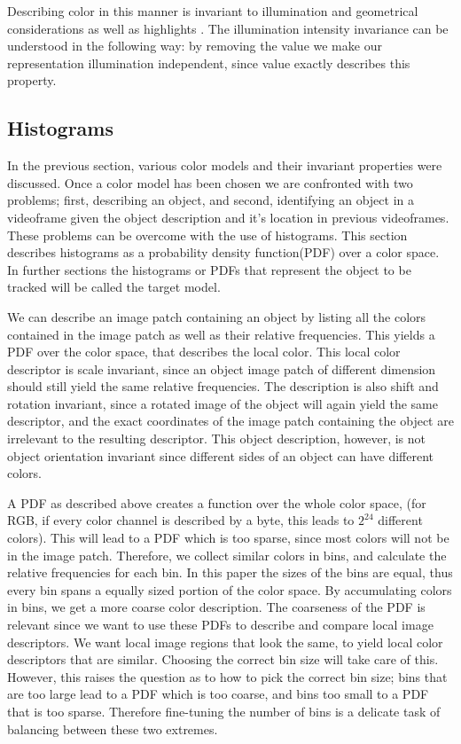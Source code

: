 \documentclass[a4paper,11pt]{article}
\begin{document}
Describing color in this manner is invariant to illumination and geometrical considerations as well as highlights \cite{gevers_invariant}. The illumination intensity invariance can be understood in the following way: by removing the value we make our representation illumination independent, since value exactly describes this property.

\subsection{Histograms}

In the previous section, various color models and their invariant properties were discussed. Once a color model has been chosen we are confronted with two problems; first, describing an object, and second, identifying an object in a videoframe given the object description and it's location in previous videoframes. These problems can be overcome with the use of histograms. This section describes histograms as a probability density function(PDF) over a color space. In further sections the histograms or PDFs that represent the object to be tracked will be called the target model.

We can describe an image patch containing an object by listing all the colors contained in the image patch as well as their relative frequencies. This yields a PDF over the color space, that describes the local color. This local color descriptor is scale invariant, since an object image patch of different dimension should still yield the same relative frequencies. The description is also shift and rotation invariant, since a rotated image of the object will again yield the same descriptor, and the exact coordinates of the image patch containing the object are irrelevant to the resulting descriptor. This object description, however, is not object orientation invariant since different sides of an object can have different colors. 

A PDF as described above creates a function over the whole color space, (for RGB, if every color channel is described by a byte, this leads to $2^{24}$ different colors). This will lead to a PDF which is too sparse, since most colors will not be in the image patch. Therefore, we collect similar colors in bins, and calculate the relative frequencies for each bin. In this paper the sizes of the bins are equal, thus every bin spans a equally sized portion of the color space. By accumulating colors in bins, we get a more coarse color description. The coarseness of the PDF is relevant since we want to use these PDFs to describe and compare local image descriptors. We want local image regions that look the same, to yield local color descriptors that are similar.  Choosing the correct bin size will take care of this. However, this raises the question as to how to pick the correct bin size; bins that are too large lead to a PDF which is too coarse, and bins too small to a PDF that is too sparse. Therefore fine-tuning the number of bins is a delicate task of balancing between these two extremes. 
\end{document}
